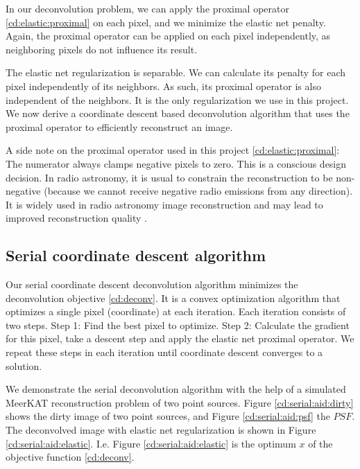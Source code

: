 In our deconvolution problem, we can apply the proximal operator \eqref{cd:elastic:proximal} on each pixel, and we minimize the elastic net penalty. Again, the proximal operator can be applied on each pixel independently, as neighboring pixels do not influence its result.

The elastic net regularization is separable. We can calculate its penalty for each pixel independently of its neighbors. As such, its proximal operator is also independent of the neighbors. It is the only regularization we use in this project. We now derive a coordinate descent based deconvolution algorithm that uses the proximal operator to efficiently reconstruct an image.

A side note on the proximal operator used in this project \eqref{cd:elastic:proximal}: The numerator always clamps negative pixels to zero. This is a conscious design decision. In radio astronomy, it is usual to constrain the reconstruction to be non-negative (because we cannot receive negative radio emissions from any direction). It is widely used in radio astronomy image reconstruction and may lead to improved reconstruction quality \cite{mcewen2011compressed}.


\subsection{Serial coordinate descent algorithm}\label{cd:serial}
Our serial coordinate descent deconvolution algorithm minimizes the deconvolution objective \eqref{cd:deconv}. It is a convex optimization algorithm that optimizes a single pixel (coordinate) at each iteration. Each iteration consists of two steps. Step 1: Find the best pixel to optimize. Step 2: Calculate the gradient for this pixel, take a descent step and apply the elastic net proximal operator. We repeat these steps in each iteration until coordinate descent converges to a solution.

We demonstrate the serial deconvolution algorithm with the help of a simulated MeerKAT reconstruction problem of two point sources. Figure \ref{cd:serial:aid:dirty} shows the dirty image of two point sources, and Figure \ref{cd:serial:aid:psf} the $PSF$. The deconvolved image with elastic net regularization is shown in Figure \ref{cd:serial:aid:elastic}. I.e. Figure \ref{cd:serial:aid:elastic} is the optimum $x$ of the objective function \eqref{cd:deconv}.

